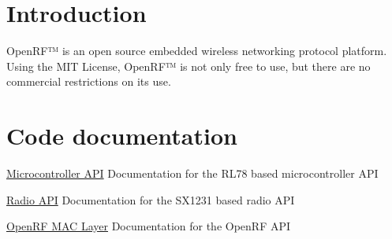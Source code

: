 \hypertarget{index_intro_sec}{}\section{Introduction}\label{index_intro_sec}
Open\-R\-F™ is an open source embedded wireless networking protocol platform. Using the M\-I\-T License, Open\-R\-F™ is not only free to use, but there are no commercial restrictions on its use.\hypertarget{index_cod_doc}{}\section{Code documentation}\label{index_cod_doc}
\hyperlink{group___microcontroller}{Microcontroller A\-P\-I} Documentation for the R\-L78 based microcontroller A\-P\-I

\hyperlink{group___radio}{Radio A\-P\-I} Documentation for the S\-X1231 based radio A\-P\-I

\hyperlink{group___open_r_f}{Open\-R\-F M\-A\-C Layer} Documentation for the Open\-R\-F A\-P\-I 